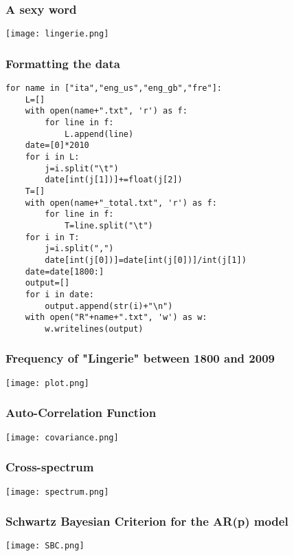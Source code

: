 \documentclass[10pt]{beamer}
\begin{document}
\begin{frame}
\frametitle{A sexy word}
	\begin{center}
       \texttt{[image: lingerie.png]}
	\end{center}
\end{frame}

\begin{frame}[fragile]
\frametitle{Formatting the data}
\begin{footnotesize}
\begin{lstlisting}
for name in ["ita","eng_us","eng_gb","fre"]:
    L=[]
    with open(name+".txt", 'r') as f:
        for line in f:
            L.append(line)
    date=[0]*2010
    for i in L:
        j=i.split("\t")
        date[int(j[1])]+=float(j[2])
    T=[]
    with open(name+"_total.txt", 'r') as f:
        for line in f:
            T=line.split("\t")
    for i in T:
        j=i.split(",")
        date[int(j[0])]=date[int(j[0])]/int(j[1])
    date=date[1800:]
    output=[]
    for i in date:
        output.append(str(i)+"\n")
    with open("R"+name+".txt", 'w') as w:
        w.writelines(output)
\end{lstlisting}
\end{footnotesize}
\end{frame}


\begin{frame}
\frametitle{Frequency of "Lingerie" between 1800 and 2009}
	\begin{center}
       \texttt{[image: plot.png]}
	\end{center}
\end{frame}


\begin{frame}
\frametitle{Auto-Correlation Function}
	\begin{center}
       \texttt{[image: covariance.png]}
	\end{center}
\end{frame}


\begin{frame}
\frametitle{Cross-spectrum}
	\begin{center}
       \texttt{[image: spectrum.png]}
	\end{center}
\end{frame}

\begin{frame}
\frametitle{Schwartz Bayesian Criterion for the AR(p) model}
	\begin{center}
       \texttt{[image: SBC.png]}
	\end{center}
\end{frame}
\end{document}
